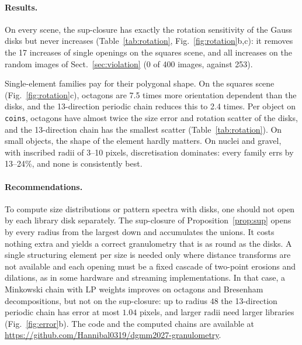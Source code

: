 \documentclass[runningheads]{llncs}
\begin{document}
\paragraph{Results.} On every scene, the sup-closure has exactly the rotation sensitivity of the Gauss disks but never increases (Table~\ref{tab:rotation}, Fig.~\ref{fig:rotation}b,c): it removes the 17 increases of single openings on the squares scene, and all increases on the random images of Sect.~\ref{sec:violation} (0 of 400 images, against 253).

Single-element families pay for their polygonal shape. On the squares scene (Fig.~\ref{fig:rotation}c), octagons are 7.5 times more orientation dependent than the disks, and the 13-direction periodic chain reduces this to 2.4 times. Per object on \texttt{coins}, octagons have almost twice the size error and rotation scatter of the disks, and the 13-direction chain has the smallest scatter (Table~\ref{tab:rotation}). On small objects, the shape of the element hardly matters. On nuclei and gravel, with inscribed radii of 3--10 pixels, discretisation dominates: every family errs by 13--24\%, and none is consistently best.

\paragraph{Recommendations.} To compute size distributions or pattern spectra with disks, one should not open by each library disk separately. The sup-closure of Proposition~\ref{prop:sup} opens by every radius from the largest down and accumulates the unions. It costs nothing extra and yields a correct granulometry that is as round as the disks. A single structuring element per size is needed only where distance transforms are not available and each opening must be a fixed cascade of two-point erosions and dilations, as in some hardware and streaming implementations. In that case, a Minkowski chain with LP weights improves on octagons and Bresenham decompositions, but not on the sup-closure: up to radius $48$ the 13-direction periodic chain has error at most $1.04$ pixels, and larger radii need larger libraries (Fig.~\ref{fig:error}b). The code and the computed chains are available at \url{https://github.com/Hannibal0319/dgmm2027-granulometry}.

\end{document}
